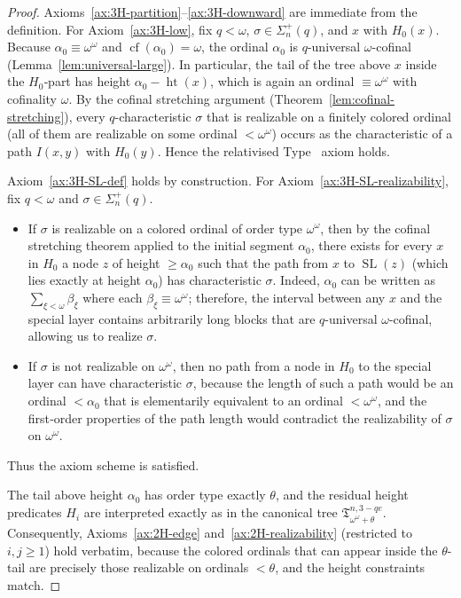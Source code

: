 \documentclass{amsart}
\newcommand{\cf}{\operatorname{cf}}
\theoremstyle{definition}
\begin{document}
\begin{proof}
    Axioms~\ref{ax:3H-partition}--\ref{ax:3H-downward} are immediate from the definition. For Axiom~\ref{ax:3H-low}, fix $q<\omega$, $\sigma\in\Sigma_n^{+}(q)$, and $x$ with $H_0(x)$.  Because $\alpha_0\equiv\omega^\omega$ and $\cf(\alpha_0)=\omega$, the ordinal $\alpha_0$ is $q$-universal $\omega$-cofinal (Lemma~\ref{lem:universal-large}). In particular, the tail of the tree above $x$ inside the $H_0$‑part has height $\alpha_0-\operatorname{ht}(x)$, which is again an ordinal $\equiv\omega^\omega$ with cofinality $\omega$.  By the cofinal stretching argument (Theorem~\ref{lem:cofinal-stretching}), every $q$-characteristic $\sigma$ that is realizable on a finitely colored ordinal (all of them are realizable on some ordinal $<\omega^\omega$) occurs as the characteristic of a path $I(x,y)$ with $H_0(y)$. Hence the relativised Type~{\MakeUppercase{}} axiom holds.

    Axiom~\ref{ax:3H-SL-def} holds by construction. For Axiom~\ref{ax:3H-SL-realizability}, fix $q<\omega$ and $\sigma\in\Sigma_n^+(q)$.
    \begin{itemize}
        \item If $\sigma$ is realizable on a colored ordinal of order type $\omega^\omega$, then by the cofinal stretching theorem applied to the initial segment $\alpha_0$, there exists for every $x$ in $H_0$ a node $z$ of height $\ge\alpha_0$ such that the path from $x$ to $\operatorname{SL}(z)$ (which lies exactly at height $\alpha_0$) has characteristic $\sigma$.  Indeed, $\alpha_0$ can be written as $\sum_{\xi<\omega}\beta_\xi$ where each $\beta_\xi\equiv\omega^\omega$; therefore, the interval between any $x$ and the special layer contains arbitrarily long blocks that are $q$-universal $\omega$-cofinal, allowing us to realize $\sigma$.
        \item If $\sigma$ is not realizable on $\omega^\omega$, then no path from a node in $H_0$ to the special layer can have characteristic $\sigma$, because the length of such a path would be an ordinal $<\alpha_0$ that is elementarily equivalent to an ordinal $<\omega^\omega$, and the first‑order properties of the path length would contradict the realizability of $\sigma$ on $\omega^\omega$.
    \end{itemize}
    Thus the axiom scheme is satisfied.

    The tail above height $\alpha_0$ has order type exactly $\theta$, and the residual height predicates $H_i$ are interpreted exactly as in the canonical tree $\mathfrak{T}_{\omega^\omega+\theta}^{n,3-qe}$.  Consequently, Axioms~\ref{ax:2H-edge} and~\ref{ax:2H-realizability} (restricted to $i,j\ge1$) hold verbatim, because the colored ordinals that can appear inside the $\theta$-tail are precisely those realizable on ordinals $<\theta$, and the height constraints match.


\end{proof}
\end{document}

